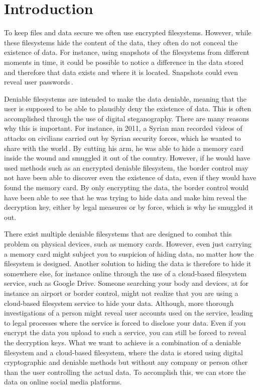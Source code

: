 
\chapter{Introduction}
\label{ch:introduction}

To keep files and data secure we often use encrypted filesystems. However, while these filesystems hide the content of the data, they often do not conceal the existence of data. For instance, using snapshots of the filesystems from different moments in time, it could be possible to notice a difference in the data stored and therefore that data exists and where it is located. Snapshots could even reveal user passwords\,\cite{hanMultiuserSteganographicFile2010}.

Deniable filesystems are intended to make the data deniable, meaning that the user is supposed to be able to plausibly deny the existence of data. This is often accomplished through the use of digital steganography. There are many reasons why this is important. For instance, in 2011, a Syrian man recorded videos of attacks on civilians carried out by Syrian security forces, which he wanted to share with the world\,\cite{westheadHowSyrianRefugee2012}. By cutting his arm, he was able to hide a memory card inside the wound and smuggled it out of the country. However, if he would have used methods such as an encrypted deniable filesystem, the border control may not have been able to discover even the existence of data, even if they would have found the memory card. By only encrypting the data, the border control would have been able to see that he was trying to hide data and make him reveal the decryption key, either by legal measures or by force, which is why he smuggled it out.

There exist multiple deniable filesystems that are designed to combat this problem on physical devices, such as memory cards. However, even just carrying a memory card might subject you to suspicion of hiding data, no matter how the filesystem is designed. Another solution to hiding the data is therefore to hide it somewhere else, for instance online through the use of a \mbox{cloud-based} filesystem service, such as Google Drive. Someone searching your body and devices, at for instance an airport or border control, might not realize that you are using a \mbox{cloud-based} filesystem service to hide your data. Although, more thorough investigations of a person might reveal user accounts used on the service, leading to legal processes where the service is forced to disclose your data. Even if you encrypt the data you upload to such a service, you can still be forced to reveal the decryption keys. What we want to achieve is a combination of a deniable filesystem and a \mbox{cloud-based} filesystem, where the data is stored using digital cryptographic and deniable methods but without any company or person other than the user controlling the actual data. To accomplish this, we can store the data on online social media platforms.

